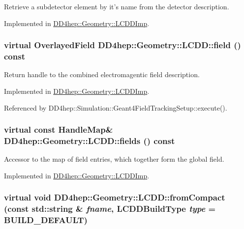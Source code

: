 Retrieve a subdetector element by it's name from the detector description. 

Implemented in \hyperlink{class_d_d4hep_1_1_geometry_1_1_l_c_d_d_imp_a32dc56ebdd198ff9d03d5fcbcb358bc8}{DD4hep::Geometry::LCDDImp}.\hypertarget{class_d_d4hep_1_1_geometry_1_1_l_c_d_d_a62750fbd02e0f4e06c570d00dc9eb2ca}{
\subsubsection[{field}]{\setlength{\rightskip}{0pt plus 5cm}virtual {\bf OverlayedField} DD4hep::Geometry::LCDD::field () const}}
\label{class_d_d4hep_1_1_geometry_1_1_l_c_d_d_a62750fbd02e0f4e06c570d00dc9eb2ca}


Return handle to the combined electromagentic field description. 

Implemented in \hyperlink{class_d_d4hep_1_1_geometry_1_1_l_c_d_d_imp_a9aaabd067b030c0999bad0ea212d8e2e}{DD4hep::Geometry::LCDDImp}.

Referenced by DD4hep::Simulation::Geant4FieldTrackingSetup::execute().\hypertarget{class_d_d4hep_1_1_geometry_1_1_l_c_d_d_af2622f438504300116fabfa214b23be5}{
\subsubsection[{fields}]{\setlength{\rightskip}{0pt plus 5cm}virtual const {\bf HandleMap}\& DD4hep::Geometry::LCDD::fields () const}}
\label{class_d_d4hep_1_1_geometry_1_1_l_c_d_d_af2622f438504300116fabfa214b23be5}


Accessor to the map of field entries, which together form the global field. 

Implemented in \hyperlink{class_d_d4hep_1_1_geometry_1_1_l_c_d_d_imp_aa4d77c879e369bc0e637e02448c5651f}{DD4hep::Geometry::LCDDImp}.\hypertarget{class_d_d4hep_1_1_geometry_1_1_l_c_d_d_abc18ac1b03188da6e4400943eca4bd2e}{
\subsubsection[{fromCompact}]{\setlength{\rightskip}{0pt plus 5cm}virtual void DD4hep::Geometry::LCDD::fromCompact (const std::string \& {\em fname}, \/  {\bf LCDDBuildType} {\em type} = {\ttfamily BUILD\_\-DEFAULT})}}
\label{class_d_d4hep_1_1_geometry_1_1_l_c_d_d_abc18ac1b03188da6e4400943eca4bd2e}


